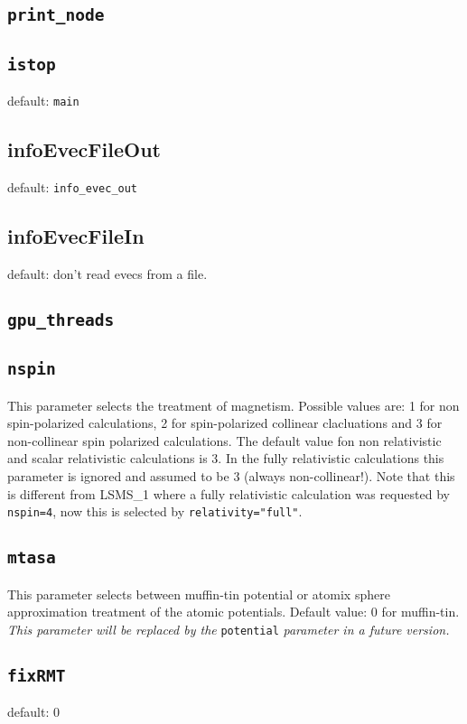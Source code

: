 \subsection{\texttt{print\_node}}

\subsection{\texttt{istop}}
default: \texttt{main}

\subsection{infoEvecFileOut}
default: \texttt{info\_evec\_out}

\subsection{infoEvecFileIn}
default: don't read evecs from a file.

\subsection{\texttt{gpu\_threads}}

\subsection{\texttt{nspin}}
This parameter selects the treatment of magnetism. Possible values are: 1 for non spin-polarized calculations,
2 for spin-polarized collinear clacluations and 3 for non-collinear spin polarized calculations.
The default value fon non relativistic and scalar relativistic
calculations is 3. In the fully relativistic
calculations this parameter is ignored and assumed to be 3 (always non-collinear!). Note that this is different from LSMS\_1
where a fully relativistic calculation was requested by \texttt{nspin=4}, now this is selected by \texttt{relativity="full"}.

\subsection{\texttt{mtasa}}
This parameter selects between muffin-tin potential or atomix sphere
approximation treatment of the atomic potentials. Default value: 0 for
muffin-tin. \textit{This parameter will be replaced by the}
\texttt{potential} \textit{parameter in a future version.}

\subsection{\texttt{fixRMT}}
default: 0


